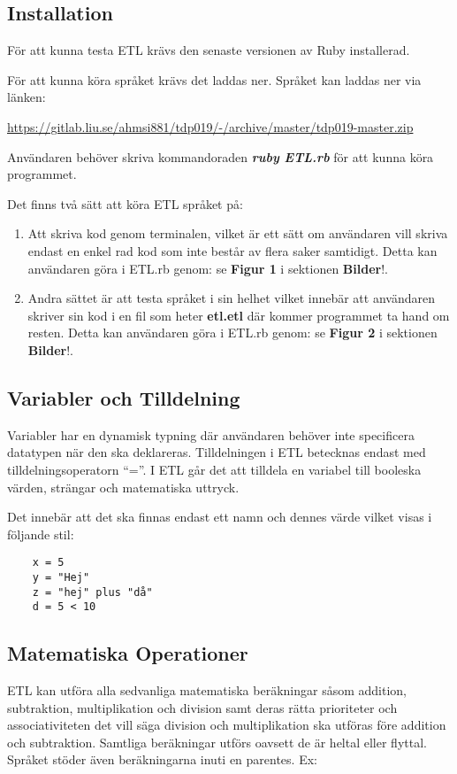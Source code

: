 \documentclass{TDP019mall}
\begin{document}
\subsection{Installation}
För att kunna testa ETL krävs den senaste versionen av Ruby installerad.

För att kunna köra språket krävs det laddas ner. Språket kan laddas ner via länken: 

\url{https://gitlab.liu.se/ahmsi881/tdp019/-/archive/master/tdp019-master.zip}

Användaren behöver skriva kommandoraden \textbf{\textit{ruby ETL.rb}} för att kunna köra programmet.

Det finns två sätt att köra ETL språket på:
\begin{enumerate}
    \item Att skriva kod genom terminalen, vilket är ett sätt om användaren vill skriva endast en enkel rad kod som inte består av flera saker samtidigt.
    Detta kan användaren göra i ETL.rb genom: se \textbf{Figur 1} i sektionen \textbf{Bilder}!.
    \item Andra sättet är att testa språket i sin helhet vilket innebär att användaren skriver sin kod i en fil som heter \textbf{etl.etl} där kommer 
    programmet ta hand om resten. Detta kan användaren göra i ETL.rb genom: se \textbf{Figur 2} i sektionen \textbf{Bilder}!.     
\end{enumerate}  

\newpage
\subsection{Variabler och Tilldelning}
Variabler har en dynamisk typning där användaren behöver inte specificera datatypen när den ska deklareras. Tilldelningen i ETL betecknas endast med 
tilldelningsoperatorn “=”. I ETL går det att tilldela en variabel till booleska värden, strängar och matematiska uttryck.

Det innebär att det ska finnas endast ett namn och dennes värde vilket visas i följande stil:
\begin{verbatim}
    x = 5 
    y = "Hej"
    z = "hej" plus "då"
    d = 5 < 10
\end{verbatim}


\subsection{Matematiska Operationer}
ETL kan utföra alla sedvanliga matematiska beräkningar såsom addition, subtraktion, multiplikation och division samt deras rätta prioriteter 
och associativiteten det vill säga division och multiplikation ska utföras före addition och subtraktion. Samtliga beräkningar utförs oavsett 
de är heltal eller flyttal. Språket stöder även beräkningarna inuti en parentes. Ex:
\end{document}
